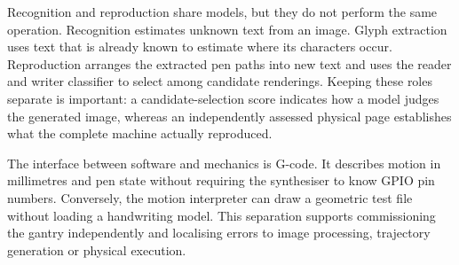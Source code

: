 Recognition and reproduction share models, but they do not perform the same operation. Recognition estimates unknown text from an image. Glyph extraction uses text that is already known to estimate where its characters occur. Reproduction arranges the extracted pen paths into new text and uses the reader and writer classifier to select among candidate renderings. Keeping these roles separate is important: a candidate-selection score indicates how a model judges the generated image, whereas an independently assessed physical page establishes what the complete machine actually reproduced.

The interface between software and mechanics is G-code. It describes motion in millimetres and pen state without requiring the synthesiser to know GPIO pin numbers. Conversely, the motion interpreter can draw a geometric test file without loading a handwriting model. This separation supports commissioning the gantry independently and localising errors to image processing, trajectory generation or physical execution.
\FloatBarrier
